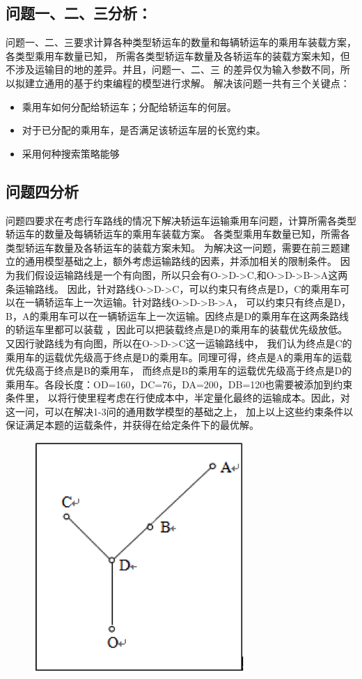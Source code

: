 \documentclass[UTF8]{ctexart}
\begin{document}
\subsection{问题一、二、三分析：}
问题一、二、三要求计算各种类型轿运车的数量和每辆轿运车的乘用车装载方案，各类型乘用车数量已知，
所需各类型轿运车数量及各轿运车的装载方案未知，但不涉及运输目的地的差异。并且，问题一、二、三
的差异仅为输入参数不同，所以拟建立通用的基于约束编程的模型进行求解。
解决该问题一共有三个关键点：
\begin{itemize}
	\item 乘用车如何分配给轿运车；分配给轿运车的何层。
	\item 对于已分配的乘用车，是否满足该轿运车层的长宽约束。
	\item 采用何种搜索策略能够
\end{itemize}



\subsection{问题四分析}
问题四要求在考虑行车路线的情况下解决轿运车运输乘用车问题，计算所需各类型轿运车的数量及每辆轿运车的乘用车装载方案。
各类型乘用车数量已知，所需各类型轿运车数量及各轿运车的装载方案未知。
为解决这一问题，需要在前三题建立的通用模型基础之上，额外考虑运输路线的因素，并添加相关的限制条件。
因为我们假设运输路线是一个有向图，所以只会有O->D->C,和O->D->B->A这两条运输路线。
因此，针对路线O->D->C，可以约束只有终点是D，C的乘用车可以在一辆轿运车上一次运输。针对路线O->D->B->A，
可以约束只有终点是D，B，A的乘用车可以在一辆轿运车上一次运输。因终点是D的乘用车在这两条路线的轿运车里都可以装载
，因此可以把装载终点是D的乘用车的装载优先级放低。又因行驶路线为有向图，所以在O->D->C这一运输路线中，
我们认为终点是C的乘用车的运载优先级高于终点是D的乘用车。同理可得，终点是A的乘用车的运载优先级高于终点是B的乘用车，
而终点是B的乘用车的运载优先级高于终点是D的乘用车。各段长度：OD=160，DC=76，DA=200，DB=120也需要被添加到约束条件里，
以将行使里程考虑在行使成本中，半定量化最终的运输成本。因此，对这一问，可以在解决1-3问的通用数学模型的基础之上，
加上以上这些约束条件以保证满足本题的运载条件，并获得在给定条件下的最优解。


\begin{figure}[h!]
	\centering
	\includegraphics[width=0.4\linewidth]{figure/Q4.png}
\end{figure}
\end{document}
